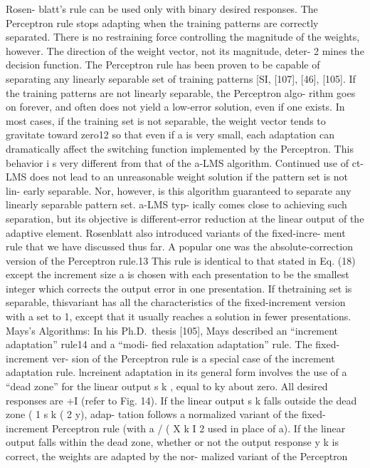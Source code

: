 Rosen- blatt's rule can be used only with binary desired responses. The
Perceptron rule stops adapting when the training patterns are correctly
separated. There is no restraining force controlling the magnitude of
the weights, however. The direction of the weight vector, not its
magnitude, deter- 2 mines the decision function. The Perceptron rule has
been proven to be capable of separating any linearly separable set of
training patterns {[}SI, {[}107{]}, {[}46{]}, {[}105{]}. If the training
patterns are not linearly separable, the Perceptron algo- rithm goes on
forever, and often does not yield a low-error solution, even if one
exists. In most cases, if the training set is not separable, the weight
vector tends to gravitate toward zero12 so that even if a is very small,
each adaptation can dramatically affect the switching function
implemented by the Perceptron. This behavior i s very different from
that of the a-LMS algorithm. Continued use of ct-LMS does not lead to an
unreasonable weight solution if the pattern set is not lin- early
separable. Nor, however, is this algorithm guaranteed to separate any
linearly separable pattern set. a-LMS typ- ically comes close to
achieving such separation, but its objective is different-error
reduction at the linear output of the adaptive element. Rosenblatt also
introduced variants of the fixed-incre- ment rule that we have discussed
thus far. A popular one was the absolute-correction version of the
Perceptron rule.13 This rule is identical to that stated in Eq. (18)
except the increment size a is chosen with each presentation to be the
smallest integer which corrects the output error in one presentation. If
thetraining set is separable, thisvariant has all the characteristics of
the fixed-increment version with a set to 1, except that it usually
reaches a solution in fewer presentations. Mays's Algorithms: In his
Ph.D.~thesis {[}105{]}, Mays described an ``increment adaptation''
rule14 and a ``modi- fied relaxation adaptation'' rule. The
fixed-increment ver- sion of the Perceptron rule is a special case of
the increment adaptation rule. lncreinent adaptation in its general form
involves the use of a ``dead zone'' for the linear output s k , equal to
ky about zero. All desired responses are +I (refer to Fig. 14). If the
linear output s k falls outside the dead zone ( 1 s k ( 2 y), adap-
tation follows a normalized variant of the fixed-increment Perceptron
rule (with a / ( X k I 2 used in place of a). If the linear output falls
within the dead zone, whether or not the output response y k is correct,
the weights are adapted by the nor- malized variant of the Perceptron
